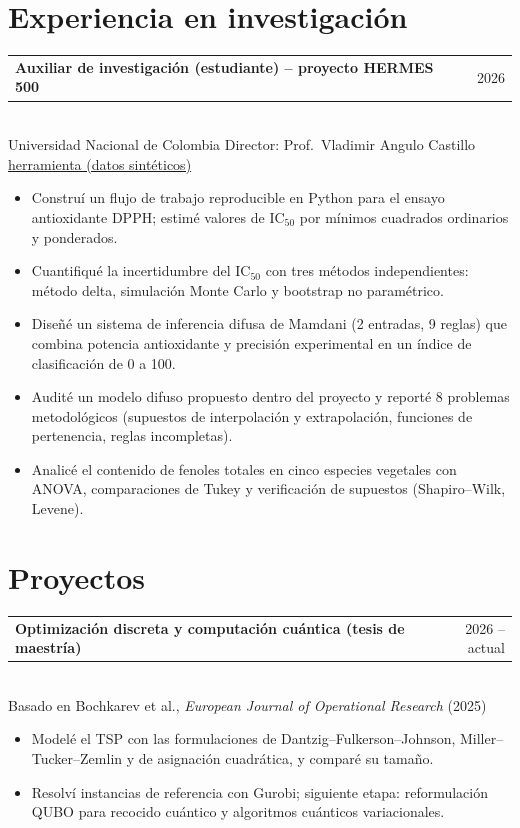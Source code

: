 \documentclass[11pt,a4paper]{article}
\makeatletter
\newcommand{\entry}[3]{%
  \begin{tabularx}{\textwidth}{@{}>{\raggedright\arraybackslash}X@{\hspace{1em}}r@{}}
    \textbf{#1} & {\color{gris}#2}
  \end{tabularx}\\
  {\color{gris}\small #3}\par\vspace{2pt}}
\makeatother
\begin{document}
\section{Experiencia en investigaci\'on}
\entry{Auxiliar de investigaci\'on (estudiante) -- proyecto HERMES 500}{2026}{Universidad Nacional de Colombia
  \textperiodcentered{} Director: Prof.\ Vladimir Angulo Castillo \textperiodcentered{}
  \href{https://github.com/Henry2899/ic50-uncertainty-toolkit}{herramienta (datos sint\'eticos)}}
\begin{itemize}
  \item Constru\'i un flujo de trabajo reproducible en Python para el ensayo antioxidante DPPH; estim\'e
        valores de IC$_{50}$ por m\'inimos cuadrados ordinarios y ponderados.
  \item Cuantifiqu\'e la incertidumbre del IC$_{50}$ con tres m\'etodos independientes: m\'etodo delta,
        simulaci\'on Monte Carlo y bootstrap no param\'etrico.
  \item Dise\~n\'e un sistema de inferencia difusa de Mamdani (2 entradas, 9 reglas) que combina potencia
        antioxidante y precisi\'on experimental en un \'indice de clasificaci\'on de 0 a 100.
  \item Audit\'e un modelo difuso propuesto dentro del proyecto y report\'e 8 problemas metodol\'ogicos
        (supuestos de interpolaci\'on y extrapolaci\'on, funciones de pertenencia, reglas incompletas).
  \item Analic\'e el contenido de fenoles totales en cinco especies vegetales con ANOVA, comparaciones de
        Tukey y verificaci\'on de supuestos (Shapiro--Wilk, Levene).
\end{itemize}

\section{Proyectos}
\entry{Optimizaci\'on discreta y computaci\'on cu\'antica (tesis de maestr\'ia)}{2026 -- actual}{Basado en
  Bochkarev et al., \emph{European Journal of Operational Research} (2025)}
\begin{itemize}
  \item Model\'e el TSP con las formulaciones de Dantzig--Fulkerson--Johnson, Miller--Tucker--Zemlin y de
        asignaci\'on cuadr\'atica, y compar\'e su tama\~no.
  \item Resolv\'i instancias de referencia con Gurobi; siguiente etapa: reformulaci\'on QUBO para
        recocido cu\'antico y algoritmos cu\'anticos variacionales.
\end{itemize}
\end{document}
